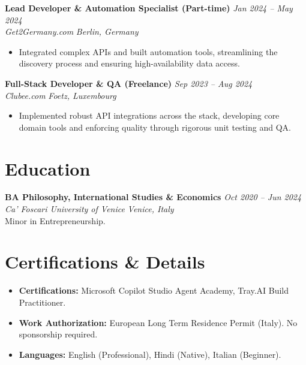 \documentclass[11pt,a4paper]{article}
\begin{document}
\noindent \textbf{Lead Developer \& Automation Specialist (Part-time)} \hfill \textit{Jan 2024 -- May 2024} \\
\textit{Get2Germany.com} \hfill \textit{Berlin, Germany}
\begin{itemize}[leftmargin=*, noitemsep]
    \item Integrated complex APIs and built automation tools, streamlining the discovery process and ensuring high-availability data access.
\end{itemize}

\vspace{6pt}

\noindent \textbf{Full-Stack Developer \& QA (Freelance)} \hfill \textit{Sep 2023 -- Aug 2024} \\
\textit{Clubee.com} \hfill \textit{Foetz, Luxembourg}
\begin{itemize}[leftmargin=*, noitemsep]
    \item Implemented robust API integrations across the stack, developing core domain tools and enforcing quality through rigorous unit testing and QA.
\end{itemize}

\section*{Education}
\noindent \textbf{BA Philosophy, International Studies \& Economics} \hfill \textit{Oct 2020 -- Jun 2024} \\
\textit{Ca' Foscari University of Venice} \hfill \textit{Venice, Italy} \\
Minor in Entrepreneurship.

\section*{Certifications \& Details}
\begin{itemize}[leftmargin=*, noitemsep]
    \item \textbf{Certifications:} Microsoft Copilot Studio Agent Academy, Tray.AI Build Practitioner.
    \item \textbf{Work Authorization:} European Long Term Residence Permit (Italy). No sponsorship required.
    \item \textbf{Languages:} English (Professional), Hindi (Native), Italian (Beginner).
\end{itemize}
\end{document}
